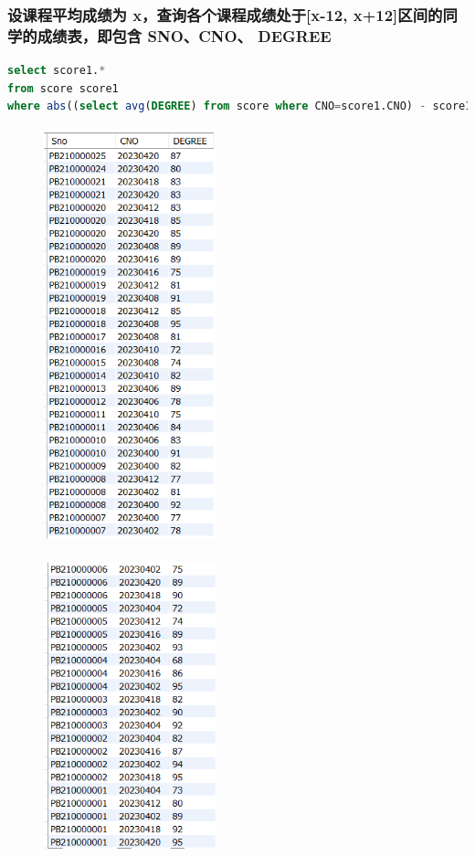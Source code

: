 \documentclass{ctexart}
\begin{document}
\subsubsection{设课程平均成绩为 x，查询各个课程成绩处于[x-12, x+12]区间的同学的成绩表，即包含 SNO、CNO、 DEGREE}
\begin{lstlisting}[language=sql]
select score1.*
from score score1
where abs((select avg(DEGREE) from score where CNO=score1.CNO) - score1.DEGREE) <= 12;

\end{lstlisting}
\begin{figure}[H]
	\centering 
	\includegraphics[height=12cm,width=5cm]{44.png}
	\end{figure}
	\begin{figure}[H]
		\centering 
		\includegraphics[height=8.5cm,width=5cm]{45.png}
		\end{figure}
\end{document}
